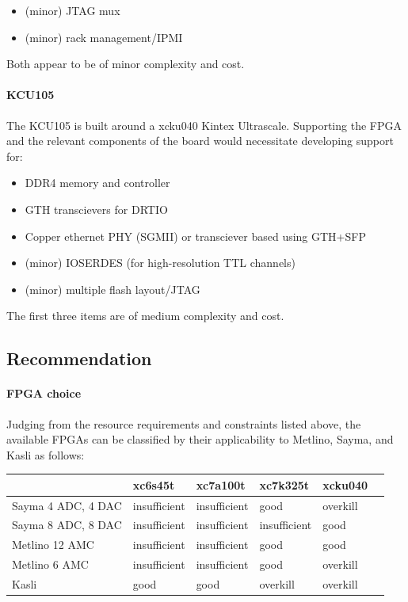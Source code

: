 \documentclass[11pt]{paper}
\begin{document}
\begin{itemize}
   \item (minor) JTAG mux
   \item (minor) rack management/IPMI
\end{itemize}

Both appear to be of minor complexity and cost.

\paragraph{KCU105}

The KCU105 is built around a xcku040 Kintex Ultrascale.
Supporting the FPGA and the relevant components of the board would necessitate developing support for:

\begin{itemize}
    \item DDR4 memory and controller
    \item GTH transcievers for DRTIO
    \item Copper ethernet PHY (SGMII) or transciever based using GTH+SFP
    \item (minor) IOSERDES (for high-resolution TTL channels)
    \item (minor) multiple flash layout/JTAG
\end{itemize}

The first three items are of medium complexity and cost.

\subsection{Recommendation}

\paragraph{FPGA choice} Judging from the resource requirements and constraints listed above, the available FPGAs can be classified by their applicability to Metlino, Sayma, and Kasli as follows:

\noindent
\begin{tabular}{l|lllll}
   & xc6s45t & xc7a100t & xc7k325t & xcku040 \\\hline
   Sayma 4 ADC, 4 DAC & insufficient & insufficient & good & overkill \\
   Sayma 8 ADC, 8 DAC & insufficient & insufficient & insufficient & good \\
   Metlino 12 AMC & insufficient & insufficient & good & good \\
   Metlino 6 AMC & insufficient & insufficient & good & overkill \\
   Kasli & good & good & overkill & overkill\\
\end{tabular}
\end{document}
